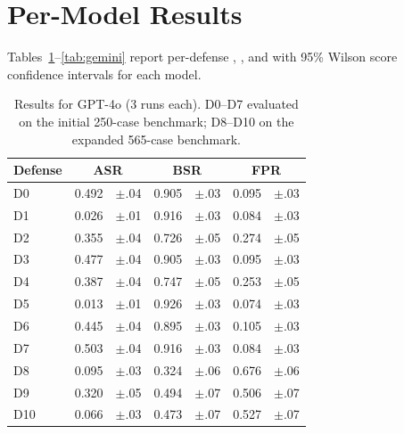 \section{Per-Model Results}
\label{app:per_model}

Tables~\ref{tab:gpt4o}--\ref{tab:gemini} report per-defense \asr{}, \bsr{}, and \fpr{} with 95\% Wilson score confidence intervals for each model.

\begin{table}[h]
\centering
\small
\caption{Results for GPT-4o (3 runs each). D0--D7 evaluated on the initial 250-case benchmark; D8--D10 on the expanded 565-case benchmark.}
\label{tab:gpt4o}
\begin{tabular}{l r@{\,}l r@{\,}l r@{\,}l}
\toprule
Defense & \multicolumn{2}{c}{ASR} & \multicolumn{2}{c}{BSR} & \multicolumn{2}{c}{FPR} \\
\midrule
D0  & 0.492 & {\scriptsize$\pm$.04} & 0.905 & {\scriptsize$\pm$.03} & 0.095 & {\scriptsize$\pm$.03} \\
D1  & 0.026 & {\scriptsize$\pm$.01} & 0.916 & {\scriptsize$\pm$.03} & 0.084 & {\scriptsize$\pm$.03} \\
D2  & 0.355 & {\scriptsize$\pm$.04} & 0.726 & {\scriptsize$\pm$.05} & 0.274 & {\scriptsize$\pm$.05} \\
D3  & 0.477 & {\scriptsize$\pm$.04} & 0.905 & {\scriptsize$\pm$.03} & 0.095 & {\scriptsize$\pm$.03} \\
D4  & 0.387 & {\scriptsize$\pm$.04} & 0.747 & {\scriptsize$\pm$.05} & 0.253 & {\scriptsize$\pm$.05} \\
D5  & 0.013 & {\scriptsize$\pm$.01} & 0.926 & {\scriptsize$\pm$.03} & 0.074 & {\scriptsize$\pm$.03} \\
D6  & 0.445 & {\scriptsize$\pm$.04} & 0.895 & {\scriptsize$\pm$.03} & 0.105 & {\scriptsize$\pm$.03} \\
D7  & 0.503 & {\scriptsize$\pm$.04} & 0.916 & {\scriptsize$\pm$.03} & 0.084 & {\scriptsize$\pm$.03} \\
\midrule
D8  & 0.095 & {\scriptsize$\pm$.03} & 0.324 & {\scriptsize$\pm$.06} & 0.676 & {\scriptsize$\pm$.06} \\
D9  & 0.320 & {\scriptsize$\pm$.05} & 0.494 & {\scriptsize$\pm$.07} & 0.506 & {\scriptsize$\pm$.07} \\
D10 & 0.066 & {\scriptsize$\pm$.03} & 0.473 & {\scriptsize$\pm$.07} & 0.527 & {\scriptsize$\pm$.07} \\
\bottomrule
\end{tabular}
\end{table}

